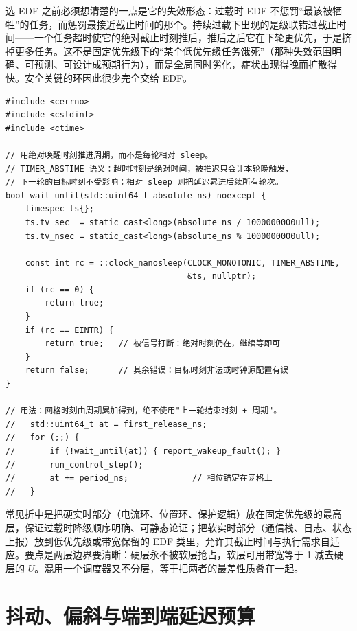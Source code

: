 \documentclass[12pt,a4paper,fontset=fandol]{ctexbook}
\begin{document}
选 EDF 之前必须想清楚的一点是它的失效形态：过载时 EDF 不惩罚“最该被牺牲”的任务，而惩罚最接近截止时间的那个。持续过载下出现的是级联错过截止时间——一个任务超时使它的绝对截止时刻推后，推后之后它在下轮更优先，于是挤掉更多任务。这不是固定优先级下的“某个低优先级任务饿死”（那种失效范围明确、可预测、可设计成预期行为），而是全局同时劣化，症状出现得晚而扩散得快。安全关键的环因此很少完全交给 EDF。

\begin{lstlisting}[style=cppstyle,caption={C++：绝对周期任务骨架（避免相对 sleep 累积漂移）},label={lst:ch10-absolute-period}]
#include <cerrno>
#include <cstdint>
#include <ctime>

// 用绝对唤醒时刻推进周期，而不是每轮相对 sleep。
// TIMER_ABSTIME 语义：超时时刻是绝对时间，被推迟只会让本轮晚触发，
// 下一轮的目标时刻不受影响；相对 sleep 则把延迟累进后续所有轮次。
bool wait_until(std::uint64_t absolute_ns) noexcept {
    timespec ts{};
    ts.tv_sec  = static_cast<long>(absolute_ns / 1000000000ull);
    ts.tv_nsec = static_cast<long>(absolute_ns % 1000000000ull);

    const int rc = ::clock_nanosleep(CLOCK_MONOTONIC, TIMER_ABSTIME,
                                     &ts, nullptr);
    if (rc == 0) {
        return true;
    }
    if (rc == EINTR) {
        return true;   // 被信号打断：绝对时刻仍在，继续等即可
    }
    return false;      // 其余错误：目标时刻非法或时钟源配置有误
}

// 用法：网格时刻由周期累加得到，绝不使用"上一轮结束时刻 + 周期"。
//   std::uint64_t at = first_release_ns;
//   for (;;) {
//       if (!wait_until(at)) { report_wakeup_fault(); }
//       run_control_step();
//       at += period_ns;             // 相位锚定在网格上
//   }
\end{lstlisting}

\begin{compare}[title={混合模型：关键环固定优先级加旁路 EDF}]
常见折中是把硬实时部分（电流环、位置环、保护逻辑）放在固定优先级的最高层，保证过载时降级顺序明确、可静态论证；把软实时部分（通信栈、日志、状态上报）放到低优先级或带宽保留的 EDF 类里，允许其截止时间与执行需求自适应。要点是两层边界要清晰：硬层永不被软层抢占，软层可用带宽等于 1 减去硬层的 $U$。混用一个调度器又不分层，等于把两者的最差性质叠在一起。
\end{compare}

\section{抖动、偏斜与端到端延迟预算}
\end{document}
